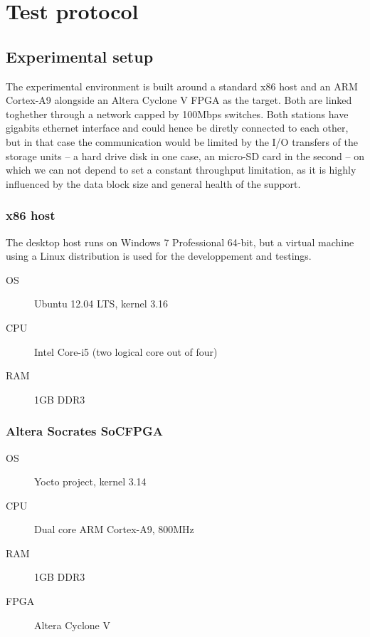 \chapter{Test protocol}\label{chap:test-protocol}

\section{Experimental setup}
The experimental environment is built around a standard x86 host and an ARM Cortex-A9 alongside an Altera Cyclone V FPGA as the target.
Both are linked toghether through a network capped by 100Mbps switches.
Both stations have gigabits ethernet interface and could hence be diretly connected to each other, but in that case the communication would be limited by the I/O transfers of the storage units -- a hard drive disk in one case, an micro-SD card in the second -- on which we can not depend to set a constant throughput limitation, as it is highly influenced by the data block size and general health of the support.


\subsection{x86 host}
The desktop host runs on Windows 7 Professional 64-bit, but a virtual machine using a Linux distribution is used for the developpement and testings.

\begin{framed}
\begin{description}
	\item[OS] Ubuntu 12.04 LTS, kernel 3.16
	\item[CPU] Intel Core-i5 (two logical core out of four)
	\item[RAM] 1GB DDR3
\end{description}
\end{framed}

\subsection{Altera Socrates SoCFPGA}

\begin{framed}
\begin{description}
	\item[OS] Yocto project, kernel 3.14
	\item[CPU] Dual core ARM Cortex-A9, 800MHz
	\item[RAM] 1GB DDR3
	\item[FPGA] Altera Cyclone V
\end{description}
\end{framed}

